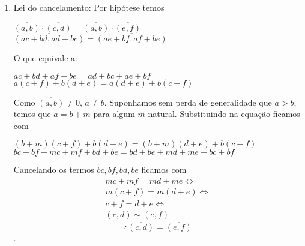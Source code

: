 \documentclass[../main.tex]{subfiles}
\begin{document}
\begin{dem}
\begin{enumerate}[label=(\roman*)]
        \item Lei do cancelamento: Por hipótese temos 
        \begin{center}
            $\overline{(a,b)} \cdot \overline{(c,d)} = \overline{(a,b)} \cdot \overline{(e,f)}$ \\
            $\overline{(ac+bd, ad+bc)} = \overline{(ae+bf, af+be)}$
        \end{center}
        O que equivale a: 
        \begin{center}
            $ac+bd+af+be = ad+bc+ae+bf$ \\
             $a(c+f) + b(d+e) = a(d+e) + b(c+f)$
        \end{center}
        Como $\overline{(a,b)} \neq 0$, $a \neq b$. Suponhamos sem perda de generalidade que $a > b$, temos que $a = b + m$ para algum $m$ natural. Substituindo na equação ficamos com 
        \begin{center}
            $(b+m)(c+f)+ b(d+e) = (b+m)(d+e)+b(c+f)$ \\
            $bc + bf + mc + mf + bd + be = bd + be + md + me + bc + bf$
        \end{center}
        Cancelando os termos $bc, bf, bd, be$ ficamos com
        \[\begin{split}
             mc + mf = md + me \iff \\
            m(c+f) = m(d+e) \iff \\
            c+f = d+e \iff \\
            (c,d) \sim (e,f)           
        \end{split} \]
       $$\therefore \overline{(c,d)} = \overline{(e,f)}$$.

    \end{enumerate}
\end{dem}
\end{document}
